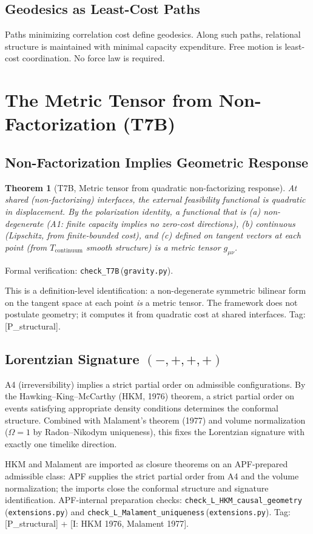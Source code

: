 \documentclass[11pt]{article}
\newtheorem{theorem}{Theorem}[section]
\newcommand{\coderef}[2]{\texttt{#1}\,(\texttt{#2})}
\begin{document}
\subsection{Geodesics as Least-Cost Paths}
Paths minimizing correlation cost define geodesics. Along such paths, relational
structure is maintained with minimal capacity expenditure. Free motion is
least-cost coordination. No force law is required.

\section{The Metric Tensor from Non-Factorization (T7B)}

\subsection{Non-Factorization Implies Geometric Response}
\begin{theorem}[T7B, Metric tensor from quadratic non-factorizing response]
At shared (non-factorizing) interfaces, the external feasibility functional is
quadratic in displacement. By the polarization identity, a functional that is
(a) non-degenerate (A1: finite capacity implies no zero-cost directions),
(b) continuous (Lipschitz, from finite-bounded cost), and (c) defined on
tangent vectors at each point (from $T_{\mathrm{continuum}}$ smooth structure)
is a metric tensor $g_{\mu\nu}$.
\end{theorem}
Formal verification: \coderef{check\_T7B}{gravity.py}.

This is a definition-level identification: a non-degenerate symmetric bilinear
form on the tangent space at each point \emph{is} a metric tensor. The framework
does not postulate geometry; it computes it from quadratic cost at shared
interfaces. Tag: [P\_structural].

\subsection{Lorentzian Signature $(-,+,+,+)$}
A4 (irreversibility) implies a strict partial order on admissible
configurations. By the Hawking--King--McCarthy (HKM, 1976) theorem, a strict
partial order on events satisfying appropriate density conditions determines the
conformal structure. Combined with Malament's theorem (1977) and volume
normalization ($\Omega = 1$ by Radon--Nikodym uniqueness), this fixes the
Lorentzian signature with exactly one timelike direction.

\begin{bridgebox}
HKM and Malament are imported as closure theorems on an APF-prepared admissible
class: APF supplies the strict partial order from A4 and the volume
normalization; the imports close the conformal structure and signature
identification. APF-internal preparation checks:
\coderef{check\_L\_HKM\_causal\_geometry}{extensions.py} and
\coderef{check\_L\_Malament\_uniqueness}{extensions.py}.
Tag: [P\_structural] + [I: HKM 1976, Malament 1977].
\end{bridgebox}
\end{document}
